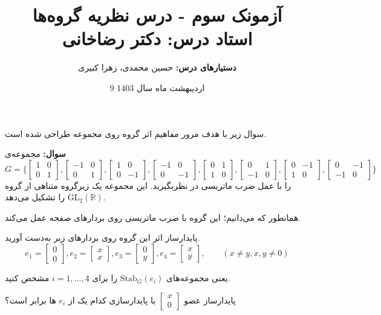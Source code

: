 \documentclass[12pt]{article}
\begin{document}
	
	\title{آزمونک سوم - درس نظریه‌ گروه‌ها
		\\
	{\normalsize 
	\textbf{استاد درس:}
	دکتر رضاخانی
	}
	}
	\author{
	\small
	\textbf{دستیارهای درس:}
	 حسین محمدی، زهرا کبیری
	} 
\date{9 اردیبهشت ماه سال 1403}
	\maketitle
	سوال زیر با هدف مرور مفاهیم اثر گروه روی مجموعه طراحی شده است.
	
	\vspace{1.5em}
	\noindent
	\textbf{ سوال:}
مجموعه‌ی 
\[
G = \Biggl\{
\begin{bmatrix}
	1&0 \\ 0&1
\end{bmatrix},
\begin{bmatrix}
	-1&0 \\ 0&1
\end{bmatrix},
\begin{bmatrix}
	1&0 \\ 0&-1
\end{bmatrix},
\begin{bmatrix}
	-1&0 \\ 0&-1
\end{bmatrix},
\begin{bmatrix}
	0&1 \\ 1&0
\end{bmatrix},
\begin{bmatrix}
	0&1 \\ -1&0
\end{bmatrix},
\begin{bmatrix}
	0&-1 \\ 1&0
\end{bmatrix},
\begin{bmatrix}
	0&-1 \\ -1&0
\end{bmatrix}
\Biggr\}
\]
را با عمل ضرب ماتریسی در نظربگیرید. این مجموعه یک زیرگروه متناهی از گروه
$\text{GL}_2(\mathbb{R})$
را تشکیل می‌دهد.
	
	\noindent
	همانطور که می‌دانیم؛ این گروه با ضرب ماتریسی روی بردارهای صفحه عمل می‌کند.
	
	\vspace{1.5em}
	\noindent
	پایدارساز اثر این گروه روی بردارهای زیر به‌دست آورید. 
\[
			e_1 = \begin{bmatrix}
				0 \\ 0
			\end{bmatrix},
				e_2 =\begin{bmatrix}
				x \\ x
			\end{bmatrix},
				e_3 =\begin{bmatrix}
				0 \\ y
			\end{bmatrix},
			e_4 =	\begin{bmatrix}
				x \\ y
			\end{bmatrix}
		, \qquad (x\neq y , x,y\neq 0)
\]

\noindent
یعنی مجموعه‌های 
$\text{Stab}_{G}(e_i)$
را برای 
$i=1,\dots,4$
مشخص کنید. 

\noindent
پایدارساز عضو 
$\begin{bmatrix}
	x \\ 0
\end{bmatrix}$
	با پایدارسازی کدام یک از 
	$e_i$ ها برابر است؟
	
	
	
	
	
	
	
\end{document}
